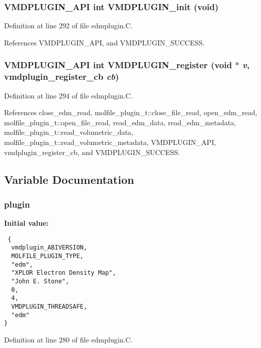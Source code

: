 \subsubsection{\setlength{\rightskip}{0pt plus 5cm}VMDPLUGIN\_\-API int VMDPLUGIN\_\-init (void)}\label{edmplugin_8C_a6}




Definition at line 292 of file edmplugin.C.

References VMDPLUGIN\_\-API, and VMDPLUGIN\_\-SUCCESS.
\subsubsection{\setlength{\rightskip}{0pt plus 5cm}VMDPLUGIN\_\-API int VMDPLUGIN\_\-register (void $\ast$ {\em v}, {\bf vmdplugin\_\-register\_\-cb} {\em cb})}\label{edmplugin_8C_a8}




Definition at line 294 of file edmplugin.C.

References close\_\-edm\_\-read, molfile\_\-plugin\_\-t::close\_\-file\_\-read, open\_\-edm\_\-read, molfile\_\-plugin\_\-t::open\_\-file\_\-read, read\_\-edm\_\-data, read\_\-edm\_\-metadata, molfile\_\-plugin\_\-t::read\_\-volumetric\_\-data, molfile\_\-plugin\_\-t::read\_\-volumetric\_\-metadata, VMDPLUGIN\_\-API, vmdplugin\_\-register\_\-cb, and VMDPLUGIN\_\-SUCCESS.

\subsection{Variable Documentation}
\subsubsection{ plugin\hspace{0.3cm}{\tt  [static]}}\label{edmplugin_8C_a0}


{\bf Initial value:}

\footnotesize\begin{verbatim} {
  vmdplugin_ABIVERSION,         
  MOLFILE_PLUGIN_TYPE,          
  "edm",                        
  "XPLOR Electron Density Map", 
  "John E. Stone",              
  0,                            
  4,                            
  VMDPLUGIN_THREADSAFE,         
  "edm"                         
}\end{verbatim}\normalsize 


Definition at line 280 of file edmplugin.C.
